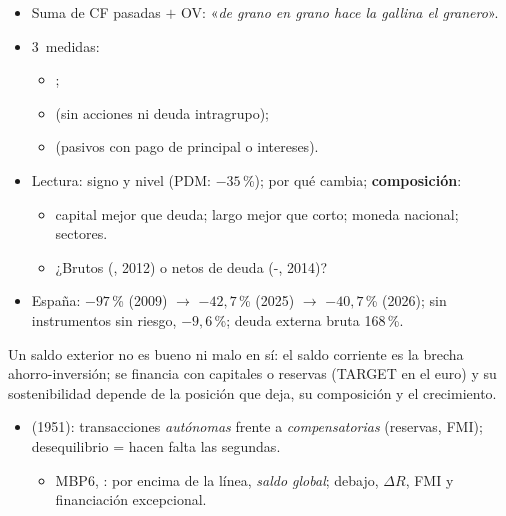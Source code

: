 \documentclass{article}
\begin{document}
\begin{columnas}
\begin{itemize}
\item Suma de CF pasadas $+$ OV: «\emph{de grano en grano hace la gallina el granero}».
\item 3~medidas:
  \begin{itemize}
  \item {};
  \item {} (sin acciones ni deuda intragrupo);
  \item {} (pasivos con pago de principal o intereses).
  \end{itemize}
\item Lectura: signo y nivel (PDM: $-35$\,\%); por qué cambia; \textbf{composición}:
  \begin{itemize}
  \item capital mejor que deuda; largo mejor que corto; moneda nacional; sectores.
  \item ¿Brutos (, 2012) o netos de deuda (-, 2014)?
  \end{itemize}
\item España: $-97$\,\% (2009) $\to$ $-42{,}7$\,\% (2025) $\to$ $-40{,}7$\,\% (2026); sin instrumentos sin riesgo, $-9{,}6$\,\%; deuda externa bruta 168\,\%.
\end{itemize}

\begin{ideaclave}
Un saldo exterior no es bueno ni malo en sí: el saldo corriente es la brecha ahorro-inversión; se financia con capitales o reservas (TARGET en el euro) y su sostenibilidad depende de la posición que deja, su composición y el crecimiento.
\end{ideaclave}
\begin{itemize}
\item {} (1951): transacciones \emph{autónomas} frente a \emph{compensatorias} (reservas, FMI); desequilibrio = hacen falta las segundas.
  \begin{itemize}
  \item MBP6, : por encima de la línea, \emph{saldo global}; debajo, $\Delta R$, FMI y financiación excepcional.
  \end{itemize}
\end{itemize}


\end{columnas}
\end{document}
